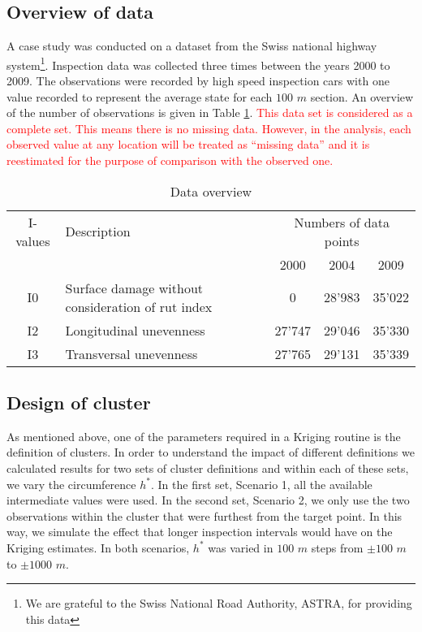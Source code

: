 \documentclass[Journal]{ascelike}
\begin{document}
\subsection{Overview of data} \label{casestudy1}
A case study was conducted on a dataset from the Swiss national highway system\footnote{We are grateful to the Swiss National Road Authority, ASTRA, for providing this data}. Inspection data was collected three 
times between the years 2000 to 2009. The observations were recorded by high speed inspection cars with one value 
recorded to represent the average state for each $100$ $m$ section. An overview of the number of observations is given in 
Table \ref{table4}. \textcolor{red}{This data set is considered as a complete set. This means there is no missing data. However, in the analysis, each observed value at any location will be treated as ``missing data'' and it is reestimated for the purpose of comparison with the observed one.}

\begin{table}[htbp]
\begin{center}
\caption{Data overview}
\begin{tabular}{l|p{6cm}|l|l|l}
\hline
\multicolumn{1}{c|}{I-values} &  Description  & \multicolumn{3}{c}{Numbers of data points} \\ 
\cline{3-5}
\multicolumn{1}{c|}{} &  & \multicolumn{1}{c|}{2000} & \multicolumn{1}{c|}{2004} & \multicolumn{1}{c}{2009} \\ 
\hline
\multicolumn{1}{c|}{I0} & Surface damage without consideration of rut index  & \multicolumn{1}{c|}{0} & \multicolumn{1}{c|}{28'983} & \multicolumn{1}{c}{35'022} \\ 
\multicolumn{1}{c|}{I2} & Longitudinal unevenness  & \multicolumn{1}{c|}{27'747} & \multicolumn{1}{c|}{29'046} & \multicolumn{1}{c}{35'330} \\ 
\multicolumn{1}{c|}{I3} & Transversal unevenness  & \multicolumn{1}{c|}{27'765} & \multicolumn{1}{c|}{29'131} & \multicolumn{1}{c}{35'339} \\ 
\hline
\end{tabular}
\label{table4}
\end{center}
\end{table}
%
\subsection{Design of cluster} \label{casestudy2}
As mentioned above, one of the parameters required in a Kriging routine is the definition of
clusters. In order to understand the impact of different definitions we calculated results for
two sets of cluster definitions and within each of these sets, we vary the circumference $h^*$. In
the first set, Scenario 1, all the available intermediate values were used. In the second set,
Scenario 2, we only use the two observations within the cluster that were furthest from the
target point. In this way, we simulate the effect that longer inspection intervals would have on
the Kriging estimates. In both scenarios, $h^*$ was varied in $100$ $m$ steps from $\pm 100$ $m$ to
$\pm 1000$ $m$.
\end{document}
